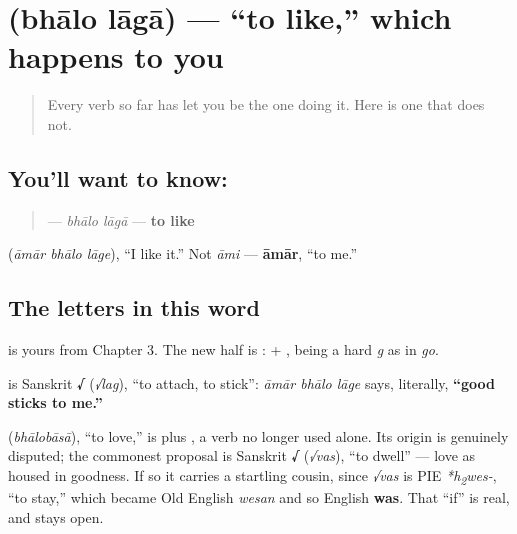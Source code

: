 \section[bhālo lāgā]{  (bhālo lāgā) — \textquotedblleft{}to like,\textquotedblright{} which happens to you}

\label{lesson:BN-C09-bhalo-laga}



\begin{quote}
Every verb so far has let you be the one doing it. Here is one that does not.
\end{quote}

\subsection*{You'll want to know:  }
\begin{quote}
\textbf{ } — \emph{bhālo lāgā} — \textbf{to like}
\end{quote}

   (\emph{āmār bhālo lāge}), \textquotedblleft{}I like it.\textquotedblright{} Not \emph{āmi} — \textbf{āmār}, \textquotedblleft{}to me.\textquotedblright{}

\subsection*{The letters in this word}
\textbf{} is yours from Chapter 3. The new half is \textbf{}: \textbf{} + \textbf{}, \textbf{} being a hard \emph{g} as in \emph{go}.

\begin{cousinweb}
\textbf{} is Sanskrit \textbf{√} (\emph{√lag}), \textquotedblleft{}to attach, to stick\textquotedblright{}: \emph{āmār bhālo lāge} says, literally, \textbf{\textquotedblleft{}good sticks to me.\textquotedblright{}}

\textbf{} (\emph{bhālobāsā}), \textquotedblleft{}to love,\textquotedblright{} is  plus \textbf{}, a verb no longer used alone. Its origin is genuinely disputed; the commonest proposal is Sanskrit \textbf{√} (\emph{√vas}), \textquotedblleft{}to dwell\textquotedblright{} — love as housed in goodness. If so it carries a startling cousin, since \emph{√vas} is PIE \emph{*h\textsubscript{2}wes-}, \textquotedblleft{}to stay,\textquotedblright{} which became Old English \emph{wesan} and so English \textbf{was}. That \textquotedblleft{}if\textquotedblright{} is real, and stays open.
\end{cousinweb}

